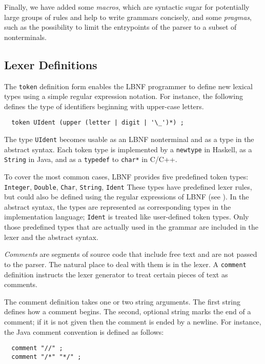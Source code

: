 Finally, we have added some {\em macros}, 
which are syntactic sugar for potentially 
large groups of rules and help to write grammars 
concisely, and some {\em pragmas}, such as the possibility
to limit the entrypoints of the parser to a subset of nonterminals.

\subsection{Lexer Definitions}
\label{lexer}


\label{reg}

The {\tt token} definition form enables the LBNF programmer
to define new lexical types using
a simple regular expression notation.
For instance, the following defines the type of
identifiers beginning with upper-case letters.
\begin{verbatim}
  token UIdent (upper (letter | digit | '\_')*) ;
\end{verbatim}
The type {\tt UIdent} becomes usable
as an LBNF nonterminal and as a type in the abstract syntax.
Each token type is implemented by a {\tt newtype} in Haskell, as
a {\tt String} in Java, and as a {\tt typedef} to {\tt char*} in C/C++.



To cover the most common cases, LBNF provides
five predefined token types:
\bequ
{\tt Integer}, 
{\tt Double}, 
{\tt Char}, 
{\tt String}, 
{\tt Ident} 
\enqu
These types have predefined lexer rules, but could also be defined
using the regular expressions of LBNF (see \cite{bnfc}).
In the abstract syntax, the types are represented as corresponding
types in the implementation language; {\tt Ident} is treated like
user-defined token types.
Only those predefined types that are actually used in
the grammar are included in the lexer and the
abstract syntax. 


\textit{Comments} are segments of source code that include free
text and are not passed to the parser. The natural place
to deal with them is in the lexer. A {\tt comment} definition instructs the
lexer generator to treat certain pieces of text as comments. 

The comment definition takes one or two string arguments. The first
string defines how a comment begins.
The second, optional string marks the end of a comment;
if it is not given then the comment is ended by a newline.
For instance, the Java comment convention is defined as follows:
\begin{verbatim}
  comment "//" ;
  comment "/*" "*/" ; 
\end{verbatim}

